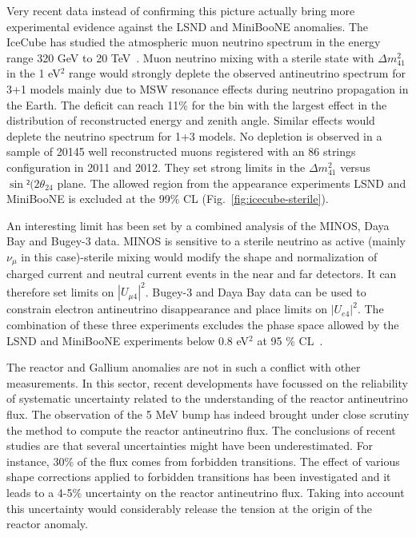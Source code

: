 Very recent data instead of confirming this picture actually bring more experimental evidence against the LSND and MiniBooNE anomalies.
The IceCube has studied the atmospheric muon neutrino spectrum in the energy range 320 GeV to 20 TeV~\cite{icecubeste}. Muon neutrino mixing with a sterile state with $\Delta m^2_{41}$ in the 1 eV$^2$ range would strongly deplete the observed antineutrino spectrum for 3+1 models mainly due to MSW resonance effects during neutrino propagation in the Earth. The deficit can reach 11\% for the bin with the largest effect in the distribution of reconstructed energy and zenith angle. Similar effects would deplete the neutrino spectrum for 1+3 models. No depletion is observed in a sample of 20145 well reconstructed muons registered with an 86 strings configuration in 2011 and 2012. They set strong limits in the 
$\Delta m^2_{41}$ versus $\sin² (2 \theta_{24}$ plane. The allowed region from the appearance experiments LSND and MiniBooNE is excluded at the 99\% CL (Fig.~\ref{fig:icecube-sterile}).  

An interesting limit has been set by a combined analysis of the MINOS, Daya Bay and Bugey-3 data. MINOS is sensitive to a sterile neutrino as active (mainly $\nu_\mu$ in this case)-sterile mixing would modify the shape and normalization of charged current and neutral current events in the near and far detectors.
It can therefore set limits on $|U_{\mu 4}|^2$. Bugey-3 and Daya Bay data can be used to constrain electron antineutrino disappearance and place limits on $|U_{e 4}|^2$. The combination of these three experiments excludes the phase space allowed by the LSND and MiniBooNE experiments below 0.8 eV$^2$ at 95 \% CL~\cite{dayabaycomb}. 

The reactor and Gallium anomalies are not in such a conflict with other measurements. In this sector, recent developments have focussed on the reliability of systematic uncertainty related to the understanding of the reactor antineutrino flux. The observation of the 5 MeV bump has indeed brought under close scrutiny the method to compute the reactor antineutrino flux. The conclusions of recent studies \cite{hayes,vogel} are that several uncertainties might have been underestimated. For instance, 30\% of the flux comes from forbidden transitions. The effect of various shape corrections applied to forbidden transitions has been investigated and it leads to a 4-5\% uncertainty on the reactor antineutrino flux. Taking into account this uncertainty would considerably release the tension at the origin of the reactor anomaly.


